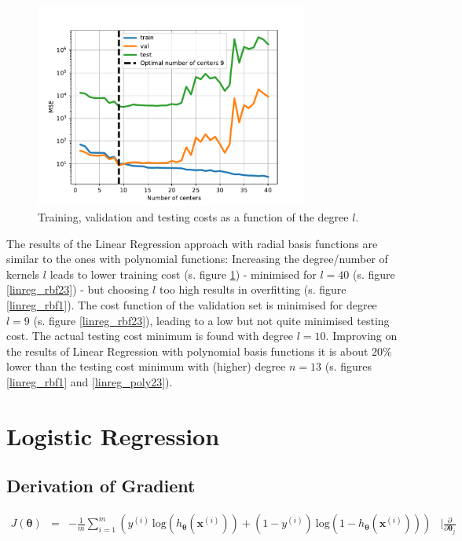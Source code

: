 \documentclass{article}
\begin{document}
\begin{figure}[!ht]
\centering
\includegraphics[width=0.8\textwidth]{./Figures/linreg_rbf4_errors.pdf}
\caption{Training, validation and testing costs as a function of the degree $l$.}
\label{linreg_rbf4}
\end{figure}

The results of the Linear Regression approach with radial basis functions are similar to the ones with polynomial functions: Increasing the degree/number of kernels $l$ leads to lower training cost (s. figure \ref{linreg_rbf4}) - minimised for $l=40$ (s. figure \ref{linreg_rbf23}) - but choosing $l$ too high results in overfitting (s. figure \ref{linreg_rbf1}). The cost function of the validation set is minimised for degree $l=9$ (s. figure \ref{linreg_rbf23}), leading to a low but not quite minimised testing cost. The actual testing cost minimum is found with degree $l=10$. Improving on the results of Linear Regression with polynomial basis functions it is about $20\%$ lower than the testing cost minimum with (higher) degree $n=13$ (s. figures \ref{linreg_rbf1} and \ref{linreg_poly23}). 


\clearpage

\section{Logistic Regression}

\subsection{Derivation of Gradient}

$$\begin{array}{rccl}
    J(\boldsymbol{\theta}) & = & - \frac{1}{m	} \displaystyle \sum_{i=1}^{m} \left(y^{(i)} \ \textrm{log}(h_{\boldsymbol{\theta}}(\boldsymbol{x}^{(i)})) + (1 - y^{(i)}) \ \textrm{log} (1 - h_{\boldsymbol{\theta}}(\boldsymbol{x}^{(i)}))\right) & \mid \frac{\partial}{\partial \boldsymbol{\theta}_j} \\\\
\end{array}$$
    
\end{document}
